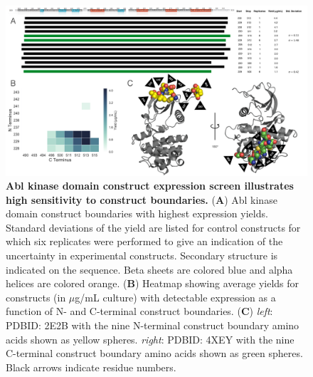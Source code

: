 \documentclass[phd,tocprelim]{cornell}
\begin{document}
\begin{landscape}
	\begin{figure}[p]
		\centering
	\includegraphics[width=\linewidth]{figures/abl1-construct-wholefigure.pdf}
	\caption[Abl kinase domain construct expression screen illustrates high sensitivity to construct boundaries.]{{\bf Abl kinase domain construct expression screen illustrates high sensitivity to construct boundaries.}
		({\bf A}) Abl kinase domain construct boundaries with highest expression yields. 
		Standard deviations of the yield are listed for control constructs for which six replicates were performed to give an indication of the uncertainty in experimental constructs. Secondary structure is indicated on the sequence. Beta sheets are colored blue and alpha helices are colored orange. 
		({\bf B}) Heatmap showing average yields for constructs (in $\mu$g/mL culture) with detectable expression as a function of N- and C-terminal construct boundaries.
		({\bf C}) \emph{left}: PDBID: 2E2B with the nine N-terminal construct boundary amino acids shown as yellow spheres. 
		\emph{right}: PDBID: 4XEY with the nine C-terminal construct boundary amino acids shown as green spheres. 
		Black arrows indicate residue numbers. 
	}
	\label{fig:ab1-const-fig}
	\end{figure}
\end{landscape}
\end{document}
